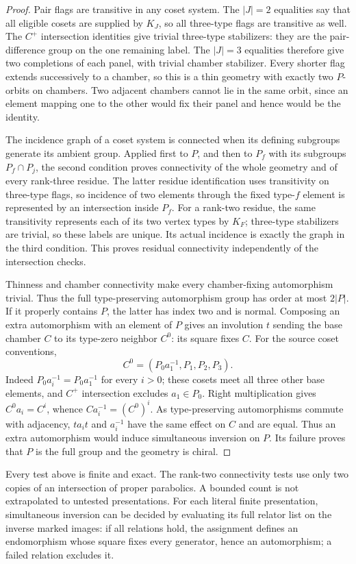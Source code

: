 \begin{proof}
Pair flags are transitive in any coset system. The $|J|=2$ equalities say
that all eligible cosets are supplied by $K_J$, so all three-type flags are
transitive as well. The $C^+$ intersection identities give trivial
three-type stabilizers: they are the pair-difference group on the one
remaining label. The $|J|=3$ equalities therefore give two completions of
each panel, with trivial chamber stabilizer. Every shorter flag extends
successively to a chamber, so this is a thin geometry with exactly two
$P$-orbits on chambers. Two adjacent chambers cannot lie in the same orbit,
since an element mapping one to the other would fix their panel and hence
would be the identity.

The incidence graph of a coset system is connected when its defining
subgroups generate its ambient group. Applied first to $P$, and then to
$P_f$ with its subgroups $P_f\cap P_j$, the second condition proves
connectivity of the whole geometry and of every rank-three residue.
The latter residue identification uses transitivity on three-type flags,
so incidence of two elements through the fixed type-$f$ element is
represented by an intersection inside $P_f$. For a rank-two residue, the
same transitivity represents each of its two vertex types by $K_F$;
three-type stabilizers are trivial, so these labels are unique. Its actual
incidence is exactly the graph in the third condition. This proves
residual connectivity independently of the intersection checks.

Thinness and chamber connectivity make every chamber-fixing automorphism
trivial. Thus the full type-preserving automorphism group has order at
most $2|P|$. If it properly contains $P$, the latter has index two and
is normal. Composing an extra automorphism with an element of $P$ gives
an involution $t$ sending the base chamber $C$ to its type-zero neighbor
$C^0$: its square fixes $C$.
For the source coset conventions,
\[
 C^0=(P_0a_1^{-1},P_1,P_2,P_3).
\]
Indeed $P_0a_i^{-1}=P_0a_1^{-1}$ for every $i>0$; these cosets meet all
three other base elements, and $C^+$ intersection excludes $a_1\in P_0$.
Right multiplication gives $C^0 a_i=C^i$, whence
$C a_i^{-1}=(C^0)^i$. As type-preserving automorphisms commute with
adjacency, $t a_i t$ and $a_i^{-1}$ have the same effect on $C$ and are
equal. Thus an extra automorphism would induce simultaneous inversion on
$P$. Its failure proves that $P$ is the full group and the geometry is
chiral.
\end{proof}

Every test above is finite and exact. The rank-two connectivity tests use
only two copies of an intersection of proper parabolics. A bounded count
is not extrapolated to untested presentations. For each literal finite
presentation, simultaneous inversion can be decided by evaluating its full
relator list on the inverse marked images: if all relations hold, the
assignment defines an endomorphism whose square fixes every generator,
hence an automorphism; a failed relation excludes it.

